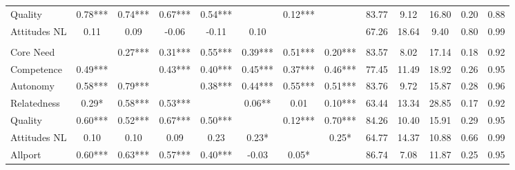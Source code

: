 \begin{table}
\begin{tabular}[t]{lccccccc | ccccc}
\hspace{1em}Quality & 0.78*** & 0.74*** & 0.67*** & 0.54*** &  & 0.12*** &  & 83.77 & 9.12 & 16.80 & 0.20 & 0.88\\
\hspace{1em}Attitudes NL & 0.11 & 0.09 & -0.06 & -0.11 & 0.10 &  &  & 67.26 & 18.64 & 9.40 & 0.80 & 0.99\\
\addlinespace[0.3em]
\multicolumn{13}{l}{\textbf{Study 3}}\\
\hspace{1em}Core Need &  & 0.27*** & 0.31*** & 0.55*** & 0.39*** & 0.51*** & 0.20*** & 83.57 & 8.02 & 17.14 & 0.18 & 0.92\\
\hspace{1em}Competence & 0.49*** &  & 0.43*** & 0.40*** & 0.45*** & 0.37*** & 0.46*** & 77.45 & 11.49 & 18.92 & 0.26 & 0.95\\
\hspace{1em}Autonomy & 0.58*** & 0.79*** &  & 0.38*** & 0.44*** & 0.55*** & 0.51*** & 83.76 & 9.72 & 15.87 & 0.28 & 0.96\\
\hspace{1em}Relatedness & 0.29* & 0.58*** & 0.53*** &  & 0.06** & 0.01 & 0.10*** & 63.44 & 13.34 & 28.85 & 0.17 & 0.92\\
\hspace{1em}Quality & 0.60*** & 0.52*** & 0.67*** & 0.50*** &  & 0.12*** & 0.70*** & 84.26 & 10.40 & 15.91 & 0.29 & 0.95\\
\hspace{1em}Attitudes NL & 0.10 & 0.10 & 0.09 & 0.23 & 0.23* &  & 0.25* & 64.77 & 14.37 & 10.88 & 0.66 & 0.99\\
\hspace{1em}Allport & 0.60*** & 0.63*** & 0.57*** & 0.40*** & -0.03 & 0.05* &  & 86.74 & 7.08 & 11.87 & 0.25 & 0.95\\
\bottomrule
\end{tabular}
\end{table}